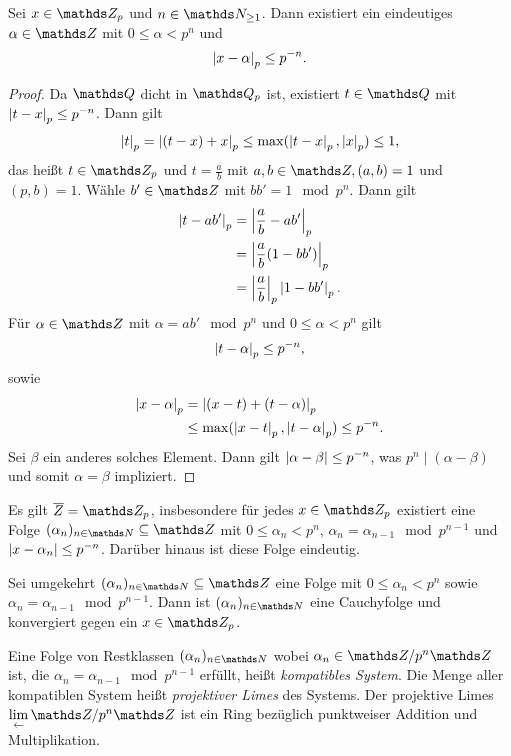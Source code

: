 \begin{satz}
Sei $x\in \Z_p$ und $n\in \N_{\geq 1}$.
Dann existiert ein eindeutiges $\alpha \in \Z$ mit $0\leq \alpha <p^n$ und
\begin{align*}
\left\vert x-\alpha\right\vert_p\leq p^{-n}.
\end{align*}
\begin{proof}
Da $\Q$ dicht in $\Q_p$ ist, existiert $t \in \Q$ mit $\left\vert t-x\right\vert_p \leq p^{-n}$.
Dann gilt
\begin{align*}
\left\vert t\right\vert_p=\left\vert(t-x)+x\right\vert_p \leq \max(\left\vert t-x\right\vert_p,\left\vert x\right\vert_p) \leq 1,
\end{align*}
das heißt $t \in \Z_p$ und $t=\frac{a}{b}$ mit $a,b\in \Z, (a,b)=1$ und $(p,b)=1$.
Wähle $b'\in \Z$ mit $bb'=1 \mod p^n$.
Dann gilt
\begin{align*}
\left\vert t-ab'\right\vert_p&=\left\vert\frac{a}{b}-ab'\right\vert_p\\
&=\left\vert\frac{a}{b}(1-bb')\right\vert_p\\
&=\left\vert\frac{a}{b}\right\vert_p \left\vert1-bb'\right\vert_p.
\end{align*}
Für $\alpha \in \Z$ mit $\alpha=ab' \mod p^n$ und $0 \leq \alpha <p^n$ gilt
\begin{align*}
\left\vert t-\alpha\right\vert_p\leq p^{-n},
\end{align*}
sowie
\begin{align*}
\left\vert x-\alpha\right\vert_p &=\left\vert(x-t)+(t-\alpha)\right\vert_p\\
&\leq \max (\left\vert x-t\right\vert_p,\left\vert t-\alpha\right\vert_p)\leq p^{-n}.
\end{align*}
Sei $\beta$ ein anderes solches Element. Dann gilt $\left\vert\alpha-\beta\right\vert\leq p^{-n}$, was $p^n\mid (\alpha-\beta)$ und somit $\alpha=\beta$ impliziert.
\end{proof}
\end{satz}

\begin{cor}
Es gilt $\overline{Z}=\Z_p$, insbesondere für jedes $x \in \Z_p$ existiert eine Folge
$(\alpha_n)_{n\in \N}\subseteq \Z$ mit $0 \leq \alpha_n<p^n$, $\alpha_n=\alpha_{n-1} \mod p^{n-1}$ und $\left\vert x-\alpha_n\right\vert\leq p^{-n}$.
Darüber hinaus ist diese Folge eindeutig.
\end{cor}

Sei umgekehrt $(\alpha_n)_{n \in \N}\subseteq \Z$ eine Folge mit $0\leq \alpha_n <p^n$ sowie $\alpha_n=\alpha_{n-1} \mod p^{n-1}$.
Dann ist $(\alpha_n)_{n\in \N}$ eine Cauchyfolge und konvergiert gegen ein $x\in \Z_p$.

\begin{defi}
Eine Folge von Restklassen $(\alpha_n)_{n\in \N}$ wobei $\alpha_n \in \Z / p^n\Z$ ist, die $\alpha_n=\alpha_{n-1} \mod p^{n-1}$ erfüllt, heißt \emph{kompatibles System}.
Die Menge aller kompatiblen System heißt \emph{projektiver Limes} des Systems.
Der projektive Limes $\lim\limits_{\leftarrow} \Z /p^n\Z$ ist ein Ring bezüglich punktweiser Addition und Multiplikation.
\end{defi}

